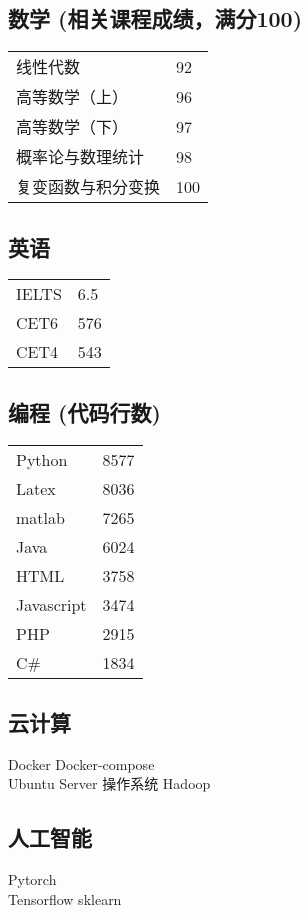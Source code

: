 \documentclass[]{deedy-resume-openfont}
\begin{document}
\begin{minipage}[t]{0.25\textwidth}
	\subsection{数学 {\small (相关课程成绩，满分100)}}
	\begin{tabular}{ll}
		线性代数           & 92  \\
		高等数学（上）     & 96  \\
		高等数学（下）     & 97  \\
		概率论与数理统计   & 98  \\
		复变函数与积分变换 & 100 \\
	\end{tabular}
	\sectionsep
	\subsection{英语}
	\begin{tabular}{ll}
		IELTS & 6.5 \\
		CET6  & 576 \\
		CET4  & 543 \\
	\end{tabular}
	\sectionsep
	\subsection{编程 {\small (代码行数)}}
	\begin{tabular}{ll}
		Python     & 8577  \\
		Latex      & 8036  \\
		matlab     & 7265  \\
		Java       & 6024  \\
		HTML       & 3758  \\
		Javascript & 3474  \\
		PHP        & 2915  \\
		C\#        & 1834  \\
	\end{tabular}
	\sectionsep
    
	\subsection{云计算}
	Docker \textbullet{} Docker-compose \\
	Ubuntu Server 操作系统 \textbullet{} Hadoop\\
	\sectionsep

	\subsection{人工智能}
	Pytorch \\
	Tensorflow \textbullet{} sklearn \\
    \sectionsep

\end{minipage}
\end{document}
